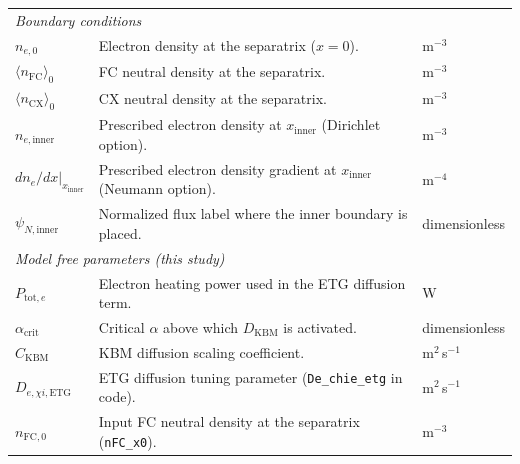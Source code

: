 \documentclass[twocolumn,secnumarabic,amssymb, nobibnotes, aps, prd]{revtex4-2}
\begin{document}
\begin{table}[t]
\begin{ruledtabular}
\begin{tabular}{lll}
\hline
\multicolumn{3}{l}{\textit{Boundary conditions}} \\
$n_{e,0}$ & Electron density at the separatrix ($x=0$). & m$^{-3}$ \\
$\langle n_{\mathrm{FC}}\rangle_0$ & FC neutral density at the separatrix. & m$^{-3}$ \\
$\langle n_{\mathrm{CX}}\rangle_0$ & CX neutral density at the separatrix. & m$^{-3}$ \\
$n_{e,\mathrm{inner}}$ & Prescribed electron density at $x_{\mathrm{inner}}$ (Dirichlet option). & m$^{-3}$ \\
$\left.{dn_e}/{dx}\right|_{x_{\mathrm{inner}}}$ & Prescribed electron density gradient at $x_{\mathrm{inner}}$ (Neumann option). & m$^{-4}$ \\
$\psi_{N,\mathrm{inner}}$ & Normalized flux label where the inner boundary is placed. & dimensionless \\
\hline
\multicolumn{3}{l}{\textit{Model free parameters (this study)}} \\
$P_{\mathrm{tot},e}$ & Electron heating power used in the ETG diffusion term. & W \\
$\alpha_{\mathrm{crit}}$ & Critical $\alpha$ above which $D_{\mathrm{KBM}}$ is activated. & dimensionless \\
$C_{\mathrm{KBM}}$ & KBM diffusion scaling coefficient. & m$^2$\,s$^{-1}$ \\
$D_{e,\chi i,\mathrm{ETG}}$ & ETG diffusion tuning parameter (\texttt{De\_chie\_etg} in code). & m$^2$\,s$^{-1}$ \\
$n_{\mathrm{FC},0}$ & Input FC neutral density at the separatrix (\texttt{nFC\_x0}). & m$^{-3}$ \\
\end{tabular}
\end{ruledtabular}
\end{table}
\end{document}
